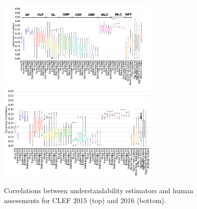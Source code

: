 \begin{figure}[h!]
   \centering
   \includegraphics[width=0.70\textwidth]{graphics/box_spearman15_raw_values_mod}\vspace{-20pt}
   \includegraphics[width=0.70\textwidth]{graphics/box_spearman16_raw_values}
   \vspace{-0.4cm}
   \caption{Correlations between understandability estimators and human assessments for CLEF 2015 (top) and 2016 (bottom).}
   \label{fig:boxplot_corr_docs}
   \vspace{-10pt}
\end{figure}

%


